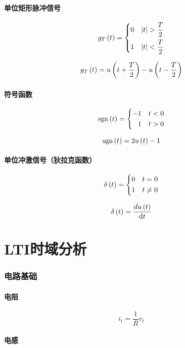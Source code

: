 \documentclass{article}
\begin{document}
\subsection{单位矩形脉冲信号}

\[g_T\pare{t}=
    \left\{\begin{aligned}
        0 &  & \abs{t}>\frac T2 \\
        1 &  & \abs{t}<\frac T2
    \end{aligned}\right.\]

\[g_T\left(t\right)=u\left(t+\frac T2\right)-u\left(t-\frac T2\right)\]

\subsection{符号函数}

\[\mathrm{sgn}\left(t\right)=
    \left\{\begin{aligned}
        -1 &  & t<0 \\
        1  &  & t>0
    \end{aligned}\right.\]

\[\mathrm{sgn}\left(t\right)=2u\left(t\right)-1\]

\subsection{单位冲激信号（狄拉克函数）}

\[\delta\left(t\right)=
    \left\{\begin{aligned}
        0 &  & t=0    \\
        1 &  & t\neq0
    \end{aligned}\right.\]

\[\delta\left(t\right)=\frac{d u\left(t\right)}{\mathrm d t}\]

\part{LTI时域分析}

\section{电路基础}

\subsection{电阻}

\[i_t=\frac1Rv_t\]

\subsection{电感}
\end{document}
